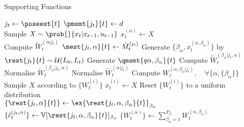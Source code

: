 \begin{algorithm}[H] %
	\caption{Supporting Functions}\label{algorithm:q-slamR:supportf}
	\begin{algorithmic}[0] 
		\State $j_t \gets \poseest{t}$
		\State $\pmsmt{j_t}{t} \gets d$
		\EndFunction
		\\ \dotfill
		\State Sample $X \sim \prob{}{x_{t}| x_{t-1}, u_{t-1}}$ 
		\State $x_{t}^{(\alpha)} \gets X$
		\EndFor
		\EndFunction
		\\ \dotfill
		\State Compute $\tilde{W}_t^{( \alpha | j_t)} $ 
		\State $\mest{j_t, \alpha}{t} \gets \hat{M}^{(j_t)}_t$ 
		\State Generate $\{\beta_\alpha, x_t^{(\alpha, \beta_\alpha)} \} $ by $\rest{j_t}{t} \sim \mathcal{U}(L_0,L_t) $ 
		\State Generate $\qmsmt{q \alpha, \beta_\alpha}{t}$ 
		\State Compute $\tilde{W}_t^{( \beta_\alpha | j_t, \alpha)}$ 
		\EndFor
		\State Normalise $\tilde{W}_t^{( \beta_\alpha | j_t, \alpha)}$ 
		\EndFor
		\State Normalise $\tilde{W}_t^{( \alpha | j_t)}$ 
		\State Compute $W_t^{(\alpha, \beta_\alpha |j_t)}, \quad \forall \{\alpha, \{\beta_\alpha\} \}$
		\EndFunction 
		\\ \dotfill
		\State Sample $X$  according to $\{W_t^{(i)}\}$
		\State $x_t^{(i)} \gets X$
		\EndFor
		\State Reset $\{W_t^{(i)}\}$ to a uniform distribution
		\EndFunction 
		\\ \dotfill
		\State $\{\rest{j_t, \alpha}{t}\} \gets \ex{\rest{j_t, \alpha, \beta_\alpha}{t}}_{\beta_\alpha}$
		\State $\{\hat{c}_t^{(j_t, \alpha)}\} \gets \mathbb{V}[\rest{j_t, \alpha, \beta_\alpha}{t}]_{\beta_\alpha}$ 
		\State $\{ W_t^{(\alpha)}\}  \gets \sum_{\beta_\alpha =1 }^{P_\beta} W_t^{(\alpha, \beta_\alpha)} $
		\EndFunction 
	\end{algorithmic}
\end{algorithm}


